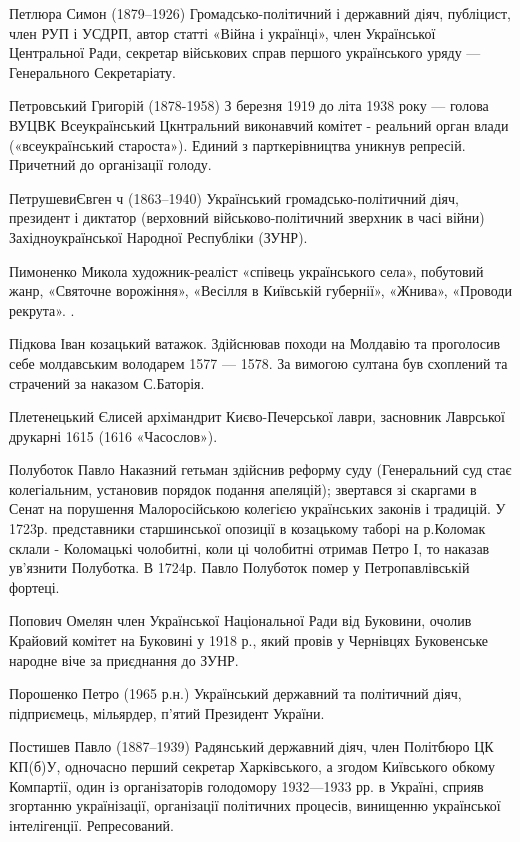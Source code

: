 Петлюра Симон (1879–1926) Громадсько-політичний і державний діяч, публіцист, член РУП і УСДРП, автор статті «Війна і українці», член Української Центральної Ради, секретар військових справ першого українського уряду — Генерального Секретаріату.

Петровський Григорій (1878-1958)  З березня 1919 до літа 1938 року — голова ВУЦВК Всеукраїнський Цкнтральний виконавчий комітет - реальний орган влади («всеукраїнський староста»). Единий з парткерівництва уникнув репресій. Причетний до організації голоду.

ПетрушевиЄвген ч (1863–1940) Український громадсько-політичний діяч, президент і диктатор (верховний військово-політичний зверхник в часі війни) Західноукраїнської Народної Республіки (ЗУНР).

Пимоненко Микола художник-реаліст «співець українського села», побутовий жанр, «Святочне ворожіння», «Весілля в Київській губернії», «Жнива», «Проводи рекрута».  . 

Підкова Іван  козацький ватажок. Здійснював походи на Молдавію та проголосив себе молдавським володарем 1577 — 1578. За вимогою султана був схоплений та страчений за наказом С.Баторія.

Плетенецький  Єлисей архімандрит Києво-Печерської лаври, засновник Лаврської друкарні 1615 (1616 «Часослов»).

Полуботок Павло  Наказний гетьман здійснив реформу суду (Генеральний суд стає колегіальним, установив порядок подання апеляцій); звертався зі скаргами в Сенат на порушення Малоросійською колегією українських законів і традицій. У 1723р. представники старшинської опозиції в козацькому таборі на р.Коломак склали - Коломацькі чолобитні, коли ці чолобитні отримав Петро І, то наказав ув’язнити Полуботка. В 1724р. Павло Полуботок помер у Петропавлівській фортеці.

Попович Омелян член Української Національної Ради від Буковини, очолив Крайовий комітет на Буковині  у 1918 р., який провів у Чернівцях Буковенське народне віче за приєднання до ЗУНР.

Порошенко Петро (1965 р.н.) Український державний та політичний діяч, підприємець, мільярдер, п’ятий Президент України.

Постишев Павло (1887–1939) Радянський державний діяч, член Політбюро ЦК КП(б)У, одночасно перший секретар Харківського, а згодом Київського обкому Компартії, один із організаторів голодомору 1932—1933 рр. в Україні, сприяв згортанню українізації, організації політичних процесів, винищенню української інтелігенції. Репресований.

